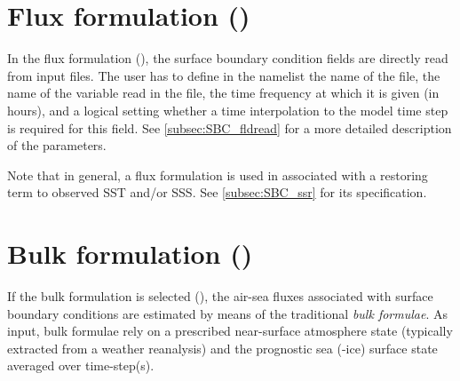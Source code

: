 \documentclass[../main/NEMO_manual]{subfiles}
\begin{document}
\section[Flux formulation (\textit{sbcflx.F90})]{Flux formulation (\protect{})}
\label{sec:SBC_flx}


\begin{listing}
  \caption{}
  \label{lst:namsbc_flx}
\end{listing}

In the flux formulation (),
the surface boundary condition fields are directly read from input files.
The user has to define in the namelist  the name of the file,
the name of the variable read in the file, the time frequency at which it is given (in hours),
and a logical setting whether a time interpolation to the model time step is required for this field.
See \autoref{subsec:SBC_fldread} for a more detailed description of the parameters.

Note that in general, a flux formulation is used in associated with a restoring term to observed SST and/or SSS.
See \autoref{subsec:SBC_ssr} for its specification.

\section[Bulk formulation (\textit{sbcblk.F90})]{Bulk formulation (\protect{})}
\label{sec:SBC_blk}


\begin{listing}
  \caption{}
  \label{lst:namsbc_blk}
\end{listing}

If the bulk formulation is selected (), the air-sea
fluxes associated with surface boundary conditions are estimated by means of the
traditional \emph{bulk formulae}. As input, bulk formulae rely on a prescribed
near-surface atmosphere state (typically extracted from a weather reanalysis)
and the prognostic sea (-ice) surface state averaged over 
time-step(s).
\end{document}
